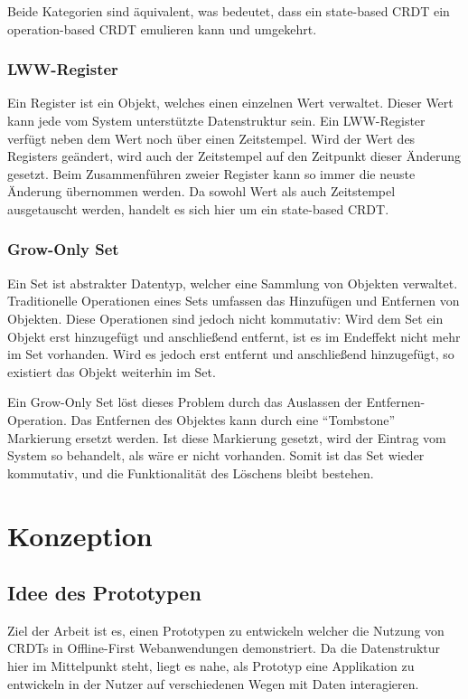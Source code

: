 \documentclass[a4paper, 12pt]{scrreprt}
\begin{document}
Beide Kategorien sind äquivalent\autocite[S. 9]{InproceedingsCRDTOriginal}, was bedeutet, dass ein state-based CRDT ein operation-based CRDT emulieren kann und umgekehrt.


\subsection{LWW-Register}
\sloppypar
Ein Register ist ein Objekt, welches einen einzelnen Wert verwaltet. Dieser Wert kann jede vom System unterstützte Datenstruktur sein. Ein \ac{LWW-Register} verfügt neben dem Wert noch über einen Zeitstempel. Wird der Wert des Registers geändert, wird auch der Zeitstempel auf den Zeitpunkt dieser Änderung gesetzt. Beim Zusammenführen zweier Register kann so immer die neuste Änderung übernommen werden. Da sowohl Wert als auch Zeitstempel ausgetauscht werden, handelt es sich hier um ein state-based CRDT.


\subsection{Grow-Only Set}
Ein Set ist abstrakter Datentyp, welcher eine Sammlung von Objekten verwaltet. Traditionelle Operationen eines Sets umfassen das Hinzufügen und Entfernen von Objekten. Diese Operationen sind jedoch nicht kommutativ: Wird dem Set ein Objekt erst hinzugefügt und anschließend entfernt, ist es im Endeffekt nicht mehr im Set vorhanden. Wird es jedoch erst entfernt und anschließend hinzugefügt, so existiert das Objekt weiterhin im Set.

Ein Grow-Only Set löst dieses Problem durch das Auslassen der Entfernen-Operation. Das Entfernen des Objektes kann durch eine \enquote{Tombstone} Markierung ersetzt werden. Ist diese Markierung gesetzt, wird der Eintrag vom System so behandelt, als wäre er nicht vorhanden. Somit ist das Set wieder kommutativ, und die Funktionalität des Löschens bleibt bestehen. 



\chapter{Konzeption}

\section{Idee des Prototypen}
Ziel der Arbeit ist es, einen Prototypen zu entwickeln welcher die Nutzung von CRDTs in Offline-First Webanwendungen demonstriert. Da die Datenstruktur hier im Mittelpunkt steht, liegt es nahe, als Prototyp eine Applikation zu entwickeln in der Nutzer auf verschiedenen Wegen mit Daten interagieren.
\end{document}
